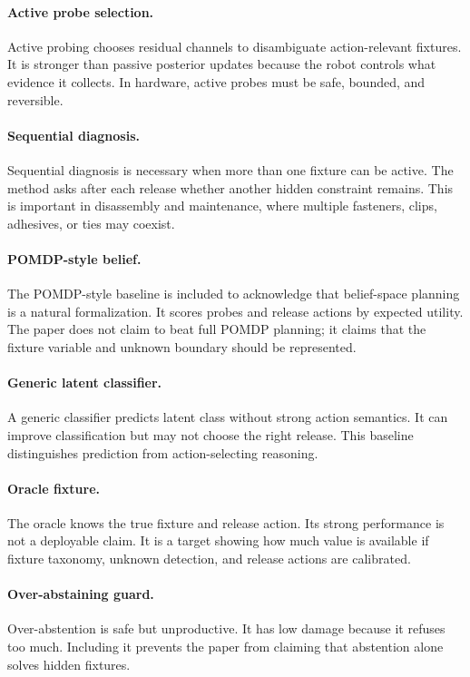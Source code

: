 \documentclass{article}
\begin{document}
\paragraph{Active probe selection.}
Active probing chooses residual channels to disambiguate action-relevant
fixtures. It is stronger than passive posterior updates because the robot
controls what evidence it collects. In hardware, active probes must be safe,
bounded, and reversible.

\paragraph{Sequential diagnosis.}
Sequential diagnosis is necessary when more than one fixture can be active.
The method asks after each release whether another hidden constraint remains.
This is important in disassembly and maintenance, where multiple fasteners,
clips, adhesives, or ties may coexist.

\paragraph{POMDP-style belief.}
The POMDP-style baseline is included to acknowledge that belief-space planning
is a natural formalization. It scores probes and release actions by expected
utility. The paper does not claim to beat full POMDP planning; it claims that
the fixture variable and unknown boundary should be represented.

\paragraph{Generic latent classifier.}
A generic classifier predicts latent class without strong action semantics. It
can improve classification but may not choose the right release. This baseline
distinguishes prediction from action-selecting reasoning.

\paragraph{Oracle fixture.}
The oracle knows the true fixture and release action. Its strong performance
is not a deployable claim. It is a target showing how much value is available
if fixture taxonomy, unknown detection, and release actions are calibrated.

\paragraph{Over-abstaining guard.}
Over-abstention is safe but unproductive. It has low damage because it refuses
too much. Including it prevents the paper from claiming that abstention alone
solves hidden fixtures.
\end{document}
